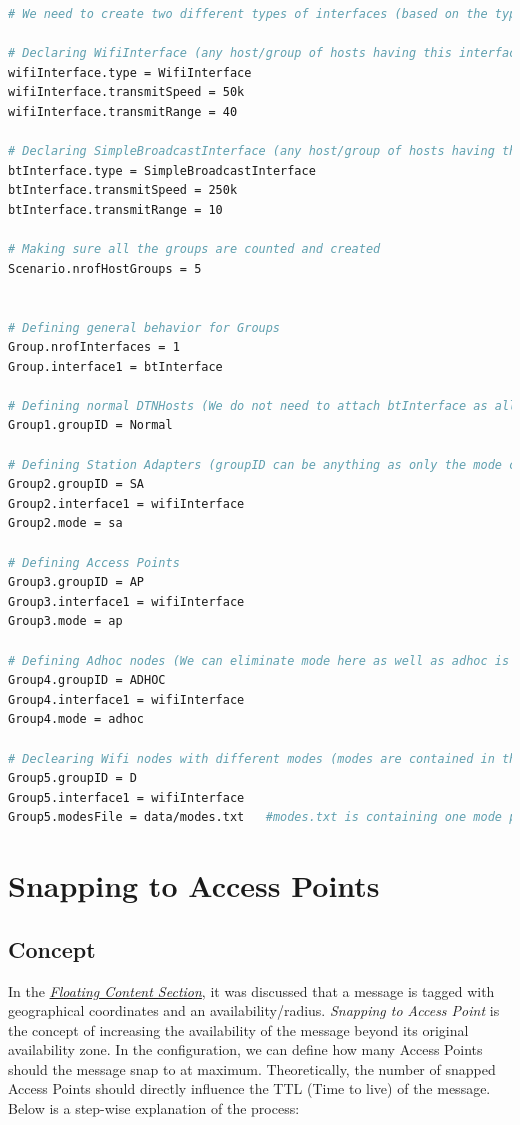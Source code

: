 \begin{lstlisting}[language=bash]
# We need to create two different types of interfaces (based on the types of interface, either DTNHost or DTNHostWithWifi object is created)

# Declaring WifiInterface (any host/group of hosts having this interface will be the DTNHostWithWifi hosts)
wifiInterface.type = WifiInterface
wifiInterface.transmitSpeed = 50k
wifiInterface.transmitRange = 40

# Declaring SimpleBroadcastInterface (any host/group of hosts having this interface will be the DTNHost hosts)
btInterface.type = SimpleBroadcastInterface
btInterface.transmitSpeed = 250k
btInterface.transmitRange = 10

# Making sure all the groups are counted and created
Scenario.nrofHostGroups = 5


# Defining general behavior for Groups
Group.nrofInterfaces = 1
Group.interface1 = btInterface

# Defining normal DTNHosts (We do not need to attach btInterface as all the groups would have the btInterface by default)
Group1.groupID = Normal

# Defining Station Adapters (groupID can be anything as only the mode can identify between different types of hosts)
Group2.groupID = SA
Group2.interface1 = wifiInterface
Group2.mode = sa

# Defining Access Points
Group3.groupID = AP
Group3.interface1 = wifiInterface
Group3.mode = ap

# Defining Adhoc nodes (We can eliminate mode here as well as adhoc is the default mode)
Group4.groupID = ADHOC
Group4.interface1 = wifiInterface
Group4.mode = adhoc

# Declearing Wifi nodes with different modes (modes are contained in the modesFile)
Group5.groupID = D
Group5.interface1 = wifiInterface
Group5.modesFile = data/modes.txt   #modes.txt is containing one mode per line. The mode is applied to the hosts in the same order

\end{lstlisting}
\newpage
\section{Snapping to Access Points}
\subsection{Concept}
In the \hyperref[section:floating-content]{\emph{Floating Content Section}}, it was discussed that a message is tagged with geographical coordinates and an availability/radius. \textit{Snapping to Access Point} is the concept of increasing the availability of the message beyond its original availability zone. In the configuration, we can define how many Access Points should the message snap to at maximum. Theoretically, the number of snapped Access Points should directly influence the TTL (Time to live) of the message. Below is a step-wise explanation of the process:

